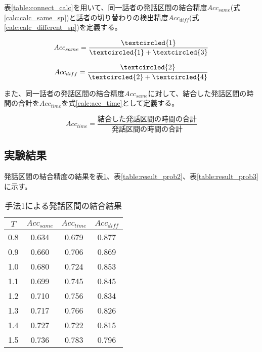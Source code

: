 表\ref{table:connect_calc}を用いて、同一話者の発話区間の結合精度$Acc_{same}$(式\ref{calc:calc_same_sp})と話者の切り替わりの検出精度$Acc_{diff}$(式\ref{calc:calc_different_sp})を定義する。

\begin{equation}
\label{calc:calc_same_sp}
Acc_{same} = \frac{\textcircled{\scriptsize 1}}{\textcircled{\scriptsize 1} + \textcircled{\scriptsize 3}}
\end{equation}

\begin{equation}
\label{calc:calc_different_sp}
Acc_{diff} = \frac{\textcircled{\scriptsize 2}}{\textcircled{\scriptsize 2} + \textcircled{\scriptsize 4}}
\end{equation}

また、同一話者の発話区間の結合精度$Acc_{same}$に対して、結合した発話区間の時間の合計を$Acc_{time}$を式\ref{calc:acc_time}として定義する。

\begin{equation}
\label{calc:acc_time}
Acc_{time} = \frac{結合した発話区間の時間の合計}{発話区間の時間の合計}
\end{equation}

\subsection{実験結果}
発話区間の結合精度の結果を表\ref{table:result_prob1}、表\ref{table:result_prob2}、表\ref{table:result_prob3}に示す。

\begin{table}[H]
\begin{center}
\caption{手法1による発話区間の結合結果 \label{table:result_prob1}}
\begin{tabular}{|c|c|c|c|}
\hline
$T$   & $Acc_{same}$ & $Acc_{time}$ & $Acc_{diff}$ \\ \hline
0.8 & 0.634    & 0.679    & 0.877    \\ \hline
0.9 & 0.660    & 0.706    & 0.869    \\ \hline
1.0 & 0.680    & 0.724    & 0.853    \\ \hline
1.1 & 0.699    & 0.745    & 0.845    \\ \hline
1.2 & 0.710    & 0.756    & 0.834    \\ \hline
1.3 & 0.717    & 0.766    & 0.826    \\ \hline
1.4 & 0.727    & 0.722    & 0.815    \\ \hline
1.5 & 0.736    & 0.783    & 0.796    \\ \hline
\end{tabular}
\end{center}
\end{table}

